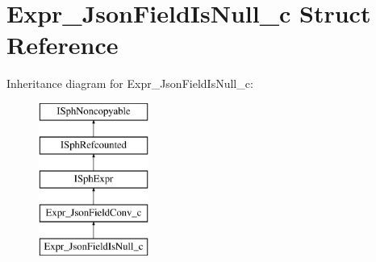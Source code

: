 \hypertarget{structExpr__JsonFieldIsNull__c}{\section{Expr\-\_\-\-Json\-Field\-Is\-Null\-\_\-c Struct Reference}
\label{structExpr__JsonFieldIsNull__c}
}
Inheritance diagram for Expr\-\_\-\-Json\-Field\-Is\-Null\-\_\-c\-:\begin{figure}[H]
\begin{center}
\leavevmode
\includegraphics[height=5.000000cm]{structExpr__JsonFieldIsNull__c}
\end{center}
\end{figure}
